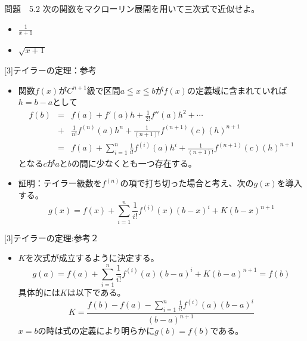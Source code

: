 \begin{slide}{問題　5.2}
次の関数をマクローリン展開を用いて三次式で近似せよ。
\begin{itemize}
\item $\frac{1}{x+1}$
\item $\sqrt{x+1}$
\end{itemize}
\end{slide}
\begin{slide}{[3]テイラーの定理：参考}
\begin{itemize}
\item 関数$f(x)$が$C^{n+1}$級で区間$a \leqq x \leqq b$が$f(x)$の定義域に含まれていれば$h=b-a$として
\begin{eqnarray}
f(b) &=& f(a) + f'(a)h+\frac{1}{2!}f''(a)h^2 + \cdots \nonumber \\
&+& \frac{1}{n!}f^{(n)}(a)h^n + \frac{1}{(n+1)!}f^{(n+1)}(c)(h)^{n+1} \nonumber \\
&=& f(a) + \sum_{i=1}^n \frac{1}{i!}f^{(i)} (a)h^i +  \frac{1}{(n+1)!}f^{(n+1)}(c)(h)^{n+1} \nonumber
\end{eqnarray}
となる$c$が$a$と$b$の間に少なくとも一つ存在する。
\item 証明：テイラー級数を$f^{(n)}$の項で打ち切った場合と考え、次の$g(x)$を導入する。
\begin{equation}
g(x) =  f(x) +  \sum_{i=1}^n \frac{1}{i!}f^{(i)}(x) (b-x)^i  + K(b-x)^{n+1}   \nonumber
\end{equation}
\end{itemize}
\end{slide}
\begin{slide}{[3]テイラーの定理:参考２}
\begin{itemize}
\item $K$を次式が成立するように決定する。
\begin{equation}
g(a) = f(a) + \sum_{i=1}^n \frac{1}{i!}f^{(i)}(a) (b-a)^i  + K(b-a)^{n+1} = f(b) \nonumber 
\end{equation}
具体的には$K$は以下である。
\begin{equation}
K = \frac{f(b) - f(a) - \sum_{i=1}^n \frac{1}{i!}f^{(i)}(a)(b-a)^i }{(b-a)^{n+1}} \label{eq:taylortheorem}
\end{equation}
$x=b$の時は式の定義により明らかに$g(b) = f(b)$である。
\end{itemize}
\end{slide}
